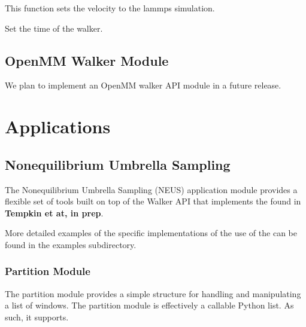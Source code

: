 \documentclass[letterpaper,10pt,english]{sphinxmanual}
\begin{document}
\begin{fulllineitems}
\begin{fulllineitems}
\end{fulllineitems}


\begin{fulllineitems}
\label{walker_api/walker_api.doc:lammpsWalker.lammpsWalker.setVel}
This function sets the velocity to the lammps simulation.

\end{fulllineitems}


\begin{fulllineitems}
\label{walker_api/walker_api.doc:lammpsWalker.lammpsWalker.set_time}
Set the time of the walker.

\end{fulllineitems}


\end{fulllineitems}



\section{OpenMM Walker Module}
\label{walker_api/walker_api.doc:openmm-walker-module}
We plan to implement an OpenMM walker API module in a future release.


\chapter{Applications}
\label{applications/applications.doc:applications}\label{applications/applications.doc::doc}

\section{Nonequilibrium Umbrella Sampling}
\label{applications/applications.doc:nonequilibrium-umbrella-sampling}
The Nonequilibrium Umbrella Sampling (NEUS) application module provides a flexible set of tools built on top of the Walker API that implements the found in \textbf{Tempkin et at, in prep}.

More detailed examples of the specific implementations of the use of the can be found in the examples subdirectory.


\subsection{Partition Module}
\label{applications/applications.doc:partition-module}
The partition module provides a simple structure for handling and manipulating a list of windows. The partition module is effectively a callable Python list. As such, it supports.
\end{document}
